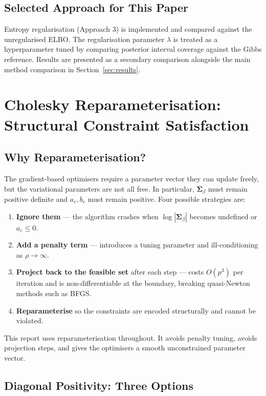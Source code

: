 \documentclass[11pt,a4paper]{article}
\begin{document}
\subsection*{Selected Approach for This Paper}

Entropy regularisation (Approach 3) is implemented and compared against the unregularised ELBO. The regularisation parameter $\lambda$ is treated as a hyperparameter tuned by comparing posterior interval coverage against the Gibbs reference. Results are presented as a secondary comparison alongside the main method comparison in Section~\ref{sec:results}.



\section{Cholesky Reparameterisation: Structural Constraint Satisfaction}\label{app:cholesky}

\subsection*{Why Reparameterisation?}

The gradient-based optimisers require a parameter vector they can update freely, but the variational parameters are not all free. In particular, $\bm{\Sigma}_\beta$ must remain positive definite and $a_e,b_e$ must remain positive. Four possible strategies are:
\begin{enumerate}
  \item \textbf{Ignore them} --- the algorithm crashes when $\log|\bm{\Sigma}_\beta|$ becomes undefined or $a_e \leq 0$.
  \item \textbf{Add a penalty term} --- introduces a tuning parameter and ill-conditioning as $\rho \to \infty$.
  \item \textbf{Project back to the feasible set} after each step --- costs $O(p^3)$ per iteration and is non-differentiable at the boundary, breaking quasi-Newton methods such as BFGS.
  \item \textbf{Reparameterise} so the constraints are encoded structurally and cannot be violated.
\end{enumerate}
This report uses reparameterisation throughout. It avoids penalty tuning, avoids projection steps, and gives the optimisers a smooth unconstrained parameter vector.

\subsection*{Diagonal Positivity: Three Options}
\end{document}
